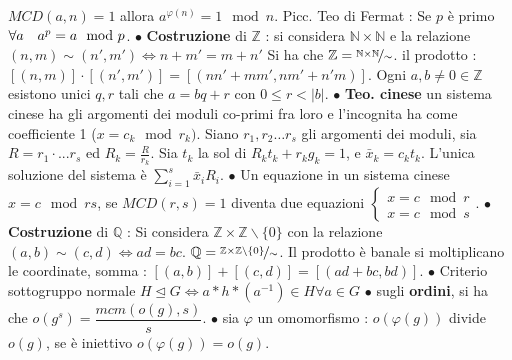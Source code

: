 \documentclass[1pt, letterpaper]{article}
\newcommand{\Z}{{\mathbb Z}}
\newcommand{\N}{{\mathbb N}}
\newcommand{\spaz}{{\text{\hphantom{aa}}}}
\newcommand{\norm}{{\unlhd}}
\newcommand{\fdot}{{\(\bullet\) }}
\begin{document}
 \(MCD(a,n)=1\) allora \(a^{\varphi(n)}=1\mod n\). Picc. Teo di Fermat : Se \(p\) è primo \(\forall a\spaz a^p=a\mod p\). \fdot \textbf{Costruzione} di \(\Z\) : si considera \(\N\times \N\) e la relazione 
 \((n,m)\sim(n',m')\iff n+m'=m+n'\) Si ha che \(\Z=\nicefrac{\N\times \N}{\sim}\). il prodotto : \([(n,m)]\cdot[(n',m')]=[(nn'+mm',nm'+n'm)]\). Ogni \(a,b\ne0\in \Z \) esistono unici \(q,r\) tali che 
 \(a=bq+r\) con \(0\le r<|b|\). \fdot \textbf{Teo. cinese} un sistema cinese  ha gli argomenti dei moduli co-primi fra loro e l'incognita ha come coefficiente 1 (\(x=c_k \mod r_k)\). Siano \(r_1,r_2\dots r_s\) gli argomenti dei moduli, 
 sia \(R=r_1\cdot...r_s\) ed \(R_k=\frac{R}{r_k}\). Sia \(t_k\) la sol di \(R_kt_k+r_kg_k=1\), e \(\bar x_k=c_kt_k\). L'unica soluzione del sistema è \(\displaystyle\sum_{i=1}^s\bar x_iR_i\). \fdot Un equazione 
 in un sistema cinese \(x=c \mod rs\), se \(MCD(r,s)=1\) diventa due equazioni \(\begin{cases}
    x=c\mod r\\x=c\mod s
 \end{cases}\).
 \fdot \textbf{Costruzione} di \(\mathbb{Q}\) : Si considera \(\Z\times \Z\backslash \{0\}\) con la relazione \((a,b)\sim(c,d)\iff ad=bc\). \(\mathbb{Q}=\nicefrac{\Z\times \Z\backslash \{0\}}{\sim}\). Il prodotto è banale 
 si moltiplicano le coordinate, somma : \([(a,b)]+[(c,d)]=[(ad+bc,bd)]\). \fdot \color{red}Criterio sottogruppo normale \color{black}\(H\norm G\iff a*h*(a^{-1})\in H \forall a\in G\) \fdot sugli \textbf{ordini},
 si ha che \(o(g^s)=\dfrac{mcm(o(g),s)}{s}\). \fdot sia \(\varphi\) un omomorfismo : \(o(\varphi(g)) \) divide \(o(g)\), se è iniettivo  \(o(\varphi(g))=o(g)\).



 
\end{document}
